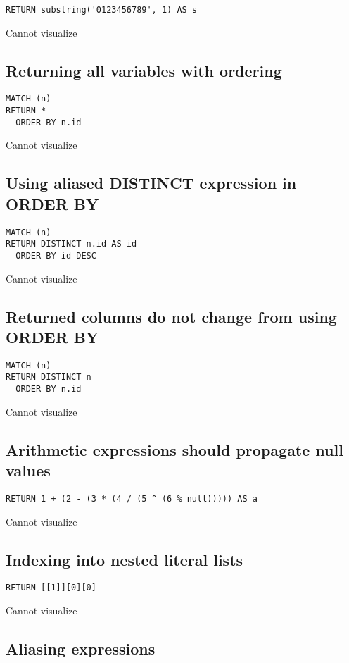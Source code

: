 \begin{lstlisting}
RETURN substring('0123456789', 1) AS s
\end{lstlisting}

Cannot visualize
\subsection{Returning all variables with ordering}

\begin{lstlisting}
MATCH (n)
RETURN *
  ORDER BY n.id
\end{lstlisting}

Cannot visualize
\subsection{Using aliased DISTINCT expression in ORDER BY}

\begin{lstlisting}
MATCH (n)
RETURN DISTINCT n.id AS id
  ORDER BY id DESC
\end{lstlisting}

Cannot visualize
\subsection{Returned columns do not change from using ORDER BY}

\begin{lstlisting}
MATCH (n)
RETURN DISTINCT n
  ORDER BY n.id
\end{lstlisting}

Cannot visualize
\subsection{Arithmetic expressions should propagate null values}

\begin{lstlisting}
RETURN 1 + (2 - (3 * (4 / (5 ^ (6 % null))))) AS a
\end{lstlisting}

Cannot visualize
\subsection{Indexing into nested literal lists}

\begin{lstlisting}
RETURN [[1]][0][0]
\end{lstlisting}

Cannot visualize
\subsection{Aliasing expressions}

